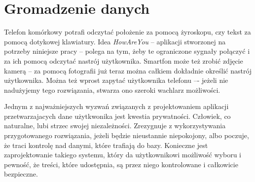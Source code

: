 
\section{Gromadzenie danych}
\label{sec:gromadzenieDanych}

Telefon komórkowy potrafi odczytać położenie za pomocą żyroskopu, czy tekst za pomocą dotykowej klawiatury. Idea \textit{HowAreYou} -- aplikacji stworzonej na potrzeby niniejsze pracy -- polega na tym, żeby te ograniczone sygnały połączyć i za ich pomocą odczytać nastrój użytkownika. Smartfon może też zrobić zdjęcie kamerą -- za pomocą fotografii już teraz można całkiem dokładnie określić nastrój użytkownika. Można też wprost zapytać użytkownika telefonu –- jeżeli nie nadużyjemy tego rozwiązania, stwarza ono szeroki wachlarz możliwości.

Jednym z najważniejszych wyzwań związanych z projektowaniem aplikacji przetwarzajacych dane użytkwonika jest kwestia prywatności. Człowiek, co naturalne, lubi strzec swojej niezależności. Zrezygnuje z wykorzystywania przygotowanego rozwiązania, jeżeli będzie nieustannie niepokojony, albo poczuje, że traci kontrolę nad danymi, które trafiają do bazy. Konieczne jest zaprojektowanie takiego systemu, który da użytkownikowi możliwość wyboru i pewność, że treści, które udostępnia, są przez niego kontrolowane i całkowicie bezpieczne.